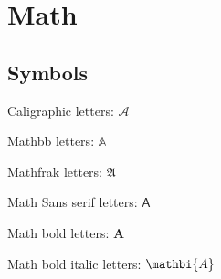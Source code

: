 \chapter{Math}

\section{Symbols}

Caligraphic letters: $\mathcal{A}$ 

Mathbb letters: $\mathbb{A}$

Mathfrak letters: $\mathfrak{A}$

Math Sans serif letters: $\mathsf{A}$

Math bold letters: $\mathbf{A}$

Math bold italic letters: $\mathbi{A}$

